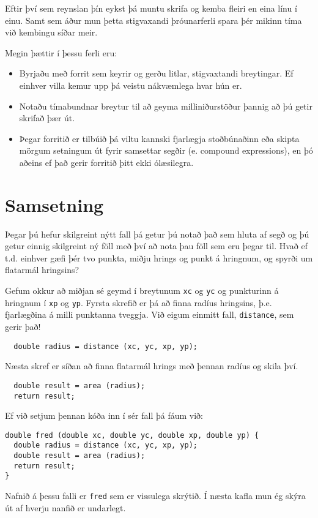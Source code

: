 Eftir því sem reynslan þín eykst þá muntu skrifa og kemba fleiri en eina línu í einu.
Samt sem áður mun þetta stigvaxandi þróunarferli spara þér mikinn tíma við kembingu síðar meir.

Megin þættir í þessu ferli eru:

\begin{itemize}

\item Byrjaðu með forrit sem keyrir og gerðu litlar, stigvaxtandi breytingar.
Ef einhver villa kemur upp þá veistu nákvæmlega hvar hún er.

\item Notaðu tímabundnar breytur til að geyma milliniðurstöður þannig að þú getir skrifað þær út.

\item Þegar forritið er tilbúið þá viltu kannski fjarlægja stoðbúnaðinn eða skipta mörgum setningum út fyrir samsettar segðir (e. compound expressions), en þó aðeins ef það gerir forritið þitt ekki ólæsilegra.

\end{itemize}

\section{Samsetning}

Þegar þú hefur skilgreint nýtt fall þá getur þú notað það sem hluta af segð og þú getur einnig skilgreint ný föll með því að nota þau föll sem eru þegar til.
Hvað ef t.d. einhver gæfi þér tvo punkta, miðju hrings og punkt á hringnum, og spyrði um flatarmál hringsins?

Gefum okkur að miðjan sé geymd í breytunum {\tt xc} og {\tt yc} og punkturinn á hringnum í {\tt xp} og {\tt yp}.
Fyrsta skrefið er þá að finna radíus hringsins, þ.e. fjarlægðina á milli punktanna tveggja.
Við eigum einmitt fall, {\tt distance}, sem gerir það!

\begin{verbatim}
  double radius = distance (xc, yc, xp, yp);
\end{verbatim}
%
Næsta skref er síðan að finna flatarmál hrings með þennan radíus og skila því.

\begin{verbatim}
  double result = area (radius);
  return result;
\end{verbatim}
%
Ef við setjum þennan kóða inn í sér fall þá fáum við:

\begin{verbatim}
double fred (double xc, double yc, double xp, double yp) {
  double radius = distance (xc, yc, xp, yp);
  double result = area (radius);
  return result;
} 
\end{verbatim}
%
Nafnið á þessu falli er {\tt fred} sem er vissulega skrýtið.
Í næsta kafla mun ég skýra út af hverju nanfið er undarlegt.

